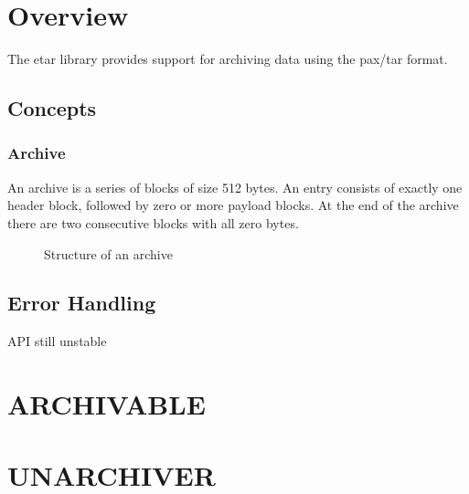 \documentclass[a4paper]{report}
\begin{document}
\chapter{Overview}
The etar library provides support for archiving data using the pax/tar format.

\section{Concepts}
\subsection{Archive}
An archive is a series of blocks of size 512 bytes. An entry consists of exactly
one header block, followed by zero or more payload blocks. At the end of the
archive there are two consecutive blocks with all zero bytes.

\begin{figure}[h]
	\begin{center}
		
	\end{center}
	\caption{Structure of an archive}
\end{figure}

\section{Error Handling}
API still unstable



\chapter{ARCHIVABLE}
\chapter{UNARCHIVER}
\end{document}

